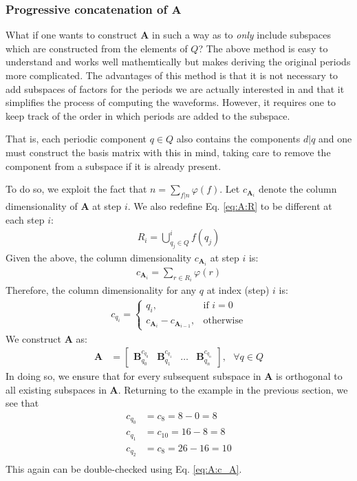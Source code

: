     \subsubsection{Progressive concatenation of $\bm{A}$}
    What if one wants to construct $\bm{A}$ in such a way as to \emph{only} include subspaces which are constructed from the elements of $Q$? The above method is easy to understand and works well mathemtically but makes deriving the original periods more complicated. The advantages of this method is that it is not necessary to add subspaces of factors for the periods we are actually interested in and that it simplifies the process of computing the waveforms. However, it requires one to keep track of the order in which periods are added to the subspace.

    That is, each periodic component $q \in Q$ also contains the components $d|q$ and one must construct the basis matrix with this in mind, taking care to remove the component from a subspace if it is already present.

    To do so, we exploit the fact that $n = \sum_{f|n} \varphi(f)$. Let $c_{\bm{A}_i}$ denote the column dimensionality of $\bm{A}$ at step $i$. We also redefine Eq. \eqref{eq:A:R} to be different at each step $i$:
    \begin{align}\label{eq:A:onlyPeriods:R}
        R_i = \bigcup^i_{q_j \in Q} f(q_j)
    \end{align}
    Given the above, the column dimensionality $c_{\bm{A}_i}$ at step $i$ is:
    \begin{align*}
        c_{\bm{A}_i} = \sum_{r \in R_i} \varphi(r)
    \end{align*}
    Therefore, the column dimensionality for any $q$ at index (step) $i$ is:
    \begin{align}
        c_{q_i} =
            \begin{cases}
                q_i, & \text{if } i = 0 \\
                c_{\bm{A}_i} - c_{\bm{A}_{i-1}}, & \text{otherwise}
            \end{cases}
    \end{align}
    We construct $\bm{A}$ as:
    \begin{align*}
        \bm{A} &= \begin{bmatrix}
                \bm{B}_{q_0}^{c_{q_0}} &
                \bm{B}_{q_1}^{c_{q_1}} &
                \hdots &
                \bm{B}_{q_n}^{c_{q_n}}
            \end{bmatrix}
            , \text{ } \forall q \in Q
    \end{align*}
    In doing so, we ensure that for every subsequent subspace in $\bm{A}$ is orthogonal to all existing subspaces in $\bm{A}$. Returning to the example in the previous section, we see that
    \begin{align*}
        c_{q_0} &= c_{8} = 8 - 0 = 8 \\
        c_{q_1} &= c_{10} = 16 - 8 = 8 \\
        c_{q_2} &= c_{8} = 26 - 16 = 10 \\
    \end{align*}
    This again can be double-checked using Eq. \eqref{eq:A:c_A}.

